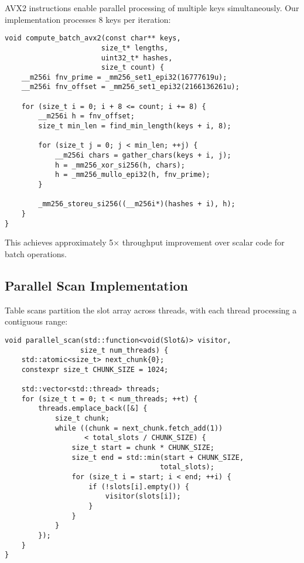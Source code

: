 \documentclass[10pt,conference]{IEEEtran}
\begin{document}
AVX2 instructions enable parallel processing of multiple keys simultaneously. Our implementation processes 8 keys per iteration:

\begin{lstlisting}[caption={SIMD batch hash computation},label={lst:simd}]
void compute_batch_avx2(const char** keys, 
                       size_t* lengths,
                       uint32_t* hashes,
                       size_t count) {
    __m256i fnv_prime = _mm256_set1_epi32(16777619u);
    __m256i fnv_offset = _mm256_set1_epi32(2166136261u);
    
    for (size_t i = 0; i + 8 <= count; i += 8) {
        __m256i h = fnv_offset;
        size_t min_len = find_min_length(keys + i, 8);
        
        for (size_t j = 0; j < min_len; ++j) {
            __m256i chars = gather_chars(keys + i, j);
            h = _mm256_xor_si256(h, chars);
            h = _mm256_mullo_epi32(h, fnv_prime);
        }
        
        _mm256_storeu_si256((__m256i*)(hashes + i), h);
    }
}
\end{lstlisting}

This achieves approximately 5× throughput improvement over scalar code for batch operations.

\subsection{Parallel Scan Implementation}

Table scans partition the slot array across threads, with each thread processing a contiguous range:

\begin{lstlisting}[caption={Parallel scan with work stealing},label={lst:parallel-scan}]
void parallel_scan(std::function<void(Slot&)> visitor,
                  size_t num_threads) {
    std::atomic<size_t> next_chunk{0};
    constexpr size_t CHUNK_SIZE = 1024;
    
    std::vector<std::thread> threads;
    for (size_t t = 0; t < num_threads; ++t) {
        threads.emplace_back([&] {
            size_t chunk;
            while ((chunk = next_chunk.fetch_add(1)) 
                   < total_slots / CHUNK_SIZE) {
                size_t start = chunk * CHUNK_SIZE;
                size_t end = std::min(start + CHUNK_SIZE,
                                     total_slots);
                for (size_t i = start; i < end; ++i) {
                    if (!slots[i].empty()) {
                        visitor(slots[i]);
                    }
                }
            }
        });
    }
}
\end{lstlisting}
\end{document}

